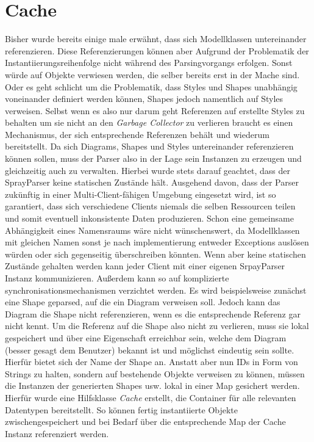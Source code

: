 \section{Cache}Bisher wurde bereits einige male erwähnt, dass sich Modellklassen untereinander referenzieren. Diese Referenzierungen können aber Aufgrund der Problematik der Instantiierungsreihenfolge nicht während des Parsingvorgangs erfolgen. Sonst würde auf Objekte verwiesen werden, die selber bereits erst in der Mache sind.
Oder es geht schlicht um die Problematik, dass Styles und Shapes unabhängig voneinander definiert werden können, Shapes jedoch namentlich auf Styles verweisen. Selbst wenn es also nur darum geht Referenzen auf erstellte Styles zu behalten um sie nicht an den \textit{Garbage Collector} zu verlieren braucht es einen Mechanismus, der sich entsprechende Referenzen behält und wiederum bereitstellt. Da sich Diagrams, Shapes und Styles untereinander referenzieren können sollen, muss der Parser also in der Lage sein Instanzen zu erzeugen und gleichzeitig auch zu verwalten. Hierbei wurde stets darauf geachtet, dass der SprayParser keine statischen Zustände hält. Ausgehend davon, dass der Parser zukünftig in einer Multi-Client-fähigen Umgebung eingesetzt wird, ist so garantiert, dass sich verschiedene Clients niemals die selben Ressourcen teilen und somit eventuell inkonsistente Daten produzieren. Schon eine gemeinsame Abhängigkeit eines Namensraums wäre nicht wünschenswert, da Modellklassen mit gleichen Namen sonst je nach implementierung entweder Exceptions auslösen würden oder sich gegenseitig überschreiben könnten. Wenn aber keine statischen Zustände gehalten werden kann jeder Client mit einer eigenen SrpayParser Instanz kommunizieren. Außerdem kann so auf komplizierte synchronisationsmechanismen verzichtet werden. Es wird beispielsweise zunächst eine Shape geparsed, auf die ein Diagram verweisen soll. Jedoch kann das Diagram die Shape nicht referenzieren, wenn es die entsprechende Referenz gar nicht kennt. Um die Referenz auf die Shape also nicht zu verlieren, muss sie lokal gespeichert und über eine Eigenschaft erreichbar sein, welche dem Diagram (besser gesagt dem Benutzer) bekannt ist und möglichst eindeutig sein sollte. Hierfür bietet sich der Name der Shape an. Anstatt aber nun IDs in Form von Strings zu halten, sondern auf bestehende Objekte verweisen zu können, müssen die Instanzen der generierten Shapes usw. lokal in einer Map gesichert werden. Hierfür wurde eine Hilfsklasse \textit{Cache} erstellt, die Container für alle relevanten Datentypen bereitstellt. So können fertig instantiierte Objekte zwischengespeichert und bei Bedarf über die entsprechende Map der Cache Instanz referenziert werden.
